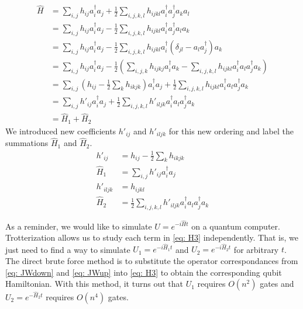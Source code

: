 \begin{equation}
    \begin{split}
        \hat{H} &= \sum_{i, j} h_{ij}a^\dag_ia_j + \frac{1}{2}\sum_{i,j,k,l} h_{ijkl}a^\dag_ia^\dag_ja_ka_l \\
        &= \sum_{i, j} h_{ij}a^\dag_ia_j - \frac{1}{2}\sum_{i,j,k,l} h_{ijkl}a^\dag_ia^\dag_ja_la_k \\
        &= \sum_{i, j} h_{ij}a^\dag_ia_j - \frac{1}{2}\sum_{i,j,k,l} h_{ijkl}a^\dag_i(\delta_{jl} - a_la^\dag_j)a_k \\
        &= \sum_{i, j} h_{ij}a^\dag_ia_j - \frac{1}{2}\left(\sum_{i, j, k}h_{ijkj}a^\dag_ia_k - \sum_{i,j,k,l} h_{ijkl}a^\dag_ia_la^\dag_ja_k\right) \\
        &= \sum_{i, j} (h_{ij} - \frac{1}{2}\sum_k h_{ikjk})a^\dag_ia_j + \frac{1}{2}\sum_{i,j,k,l} h_{ijkl}a^\dag_ia_la^\dag_ja_k \\
        &= \sum_{i, j} h'_{ij}a^\dag_ia_j + \frac{1}{2}\sum_{i,j,k,l} h'_{iljk}a^\dag_ia_la^\dag_ja_k \\
        &= \hat{H}_1 + \hat{H}_2
    \end{split}
    \label{eq: H3}
\end{equation}
We introduced new coefficients $h'_{ij}$ and $h'_{iljk}$ for this new ordering and label the summations $\hat{H}_1$ and $\hat{H}_2$.
\begin{equation}
    \begin{split}
        h'_{ij} &= h_{ij} - \frac{1}{2}\sum_k h_{ikjk} \\
        \hat{H}_1 &= \sum_{i, j} h'_{ij}a^\dag_ia_j \\
        h'_{iljk} &= h_{ijkl} \\
        \hat{H}_2 &= \frac{1}{2}\sum_{i,j,k,l} h'_{iljk}a^\dag_ia_la^\dag_ja_k
    \end{split}
\end{equation}

As a reminder, we would like to simulate $U = e^{-i\hat{H}t}$ on a quantum computer. Trotterization allows us to study each term in \eqref{eq: H3} independently. That is, we just need to find a way to simulate $U_1 = e^{-i\hat{H}_1t}$ and $U_2 = e^{-i\hat{H}_2t}$ for arbitrary $t$. The direct brute force method is to substitute the operator correspondances from \eqref{eq: JWdown} and \eqref{eq: JWup} into \eqref{eq: H3} to obtain the corresponding qubit Hamiltonian. With this method, it turns out that $U_1$ requires $O(n^2)$ gates and $U_2 = e^{-\hat{H}_2t}$ requires $O(n^4)$ gates.

